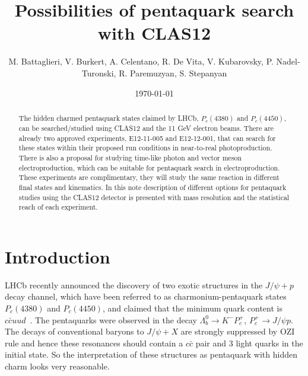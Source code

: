 \documentclass[12pt]{revtex4}
\newcommand{\JLAB}{Thomas Jefferson National Accelerator Facility, Newport News, Virginia 23606}
\begin{document}
\title{Possibilities of pentaquark search with CLAS12}
\author{M. Battaglieri, V. Burkert, A. Celentano, R. De Vita, V. Kubarovsky, P. Nadel-Turonski, R. Paremuzyan, S. Stepanyan}
\date{\today}

\begin{abstract}
\vspace{1.cm}

The hidden charmed pentaquark states claimed by LHCb, $P_c(4380)$ and $P_c(4450)$, can be searched/studied using CLAS12 and the 11 GeV electron beams. There are already two approved experiments, E12-11-005 and E12-12-001, that can search for these states within their proposed run conditions in near-to-real photoproduction. There is also a proposal for studying time-like photon and vector meson electroproduction, which can be suitable for pentaquark search in electroproduction. These experiments are complimentary, they will study the same reaction in different final states and kinematics. In this note description of different options for pentaquark studies using the CLAS12 detector is presented with mass resolution and the statistical reach of each experiment.
\end{abstract}

\maketitle


\section{Introduction}

LHCb recently announced the 
discovery of two exotic structures in the $J/\psi + p$ decay channel, which have been referred to as charmonium-pentaquark states $P_c(4380)$ and $P_c(4450)$, and claimed that the minimum quark content is $c\bar c u u d$~\cite{lhcb_penta}. The pentaquarks were observed in the decay $\Lambda_b^0\to K^-P_c^+$, $P_c^+\to J/\psi p$.
The decays of conventional baryons to $J/\psi+X$ are strongly suppressed by OZI rule and hence  these resonances should contain a $c\bar c$ pair  and  3 light quarks in the initial state.
So the interpretation of these structures as pentaquark with hidden charm looks very reasonable. 
\end{document}
